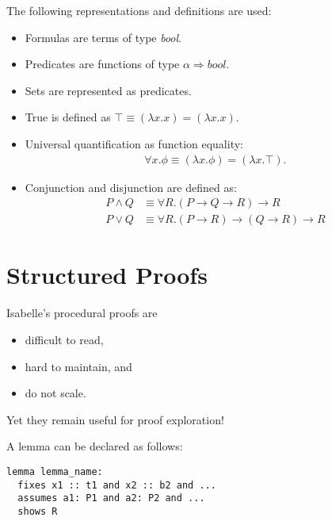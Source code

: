 \documentclass{article}
\begin{document}
\begin{definition}
	The following representations and definitions are used:
	\begin{itemize}
		\item Formulas are terms of type \textit{bool}.
		\item Predicates are functions of type $\alpha\Rightarrow\textit{bool}$.
		\item Sets are represented as predicates.
		\item True is defined as $\top \equiv (\lambda x.x)=(\lambda x.x)$.
		\item Universal quantification as function equality: \begin{align*}
			      \forall x. \phi \equiv (\lambda x. \phi) = (\lambda x. \top).
		      \end{align*}
		\item Conjunction and disjunction are defined as: \begin{align*}
			      P\wedge Q & \equiv \forall R. (P\rightarrow Q \rightarrow R) \rightarrow R               \\
			      P\vee Q   & \equiv \forall R. (P\rightarrow R)\rightarrow (Q\rightarrow R) \rightarrow R
		      \end{align*}
	\end{itemize}
\end{definition}

\section{Structured Proofs}

Isabelle's procedural proofs are
\begin{itemize}
	\item difficult to read,
	\item hard to maintain, and
	\item do not scale.
\end{itemize}
Yet they remain useful for proof exploration!

\begin{definition}[Lemma]
	A lemma can be declared as follows:
	\begin{verbatim}
lemma lemma_name:
  fixes x1 :: t1 and x2 :: b2 and ...
  assumes a1: P1 and a2: P2 and ... 
  shows R
	\end{verbatim}
\end{definition}
\end{document}
